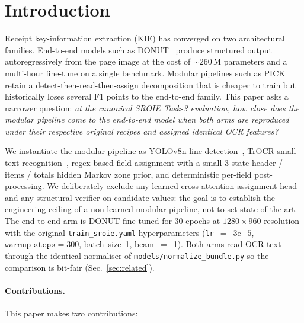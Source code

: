 
\section{Introduction}
\label{sec:intro}

Receipt key-information extraction (KIE) has converged on two
architectural families.  End-to-end models such as
DONUT~\cite{kim2022donut} produce structured output autoregressively
from the page image at the cost of $\sim\!260$\,M parameters and a
multi-hour fine-tune on a single benchmark.  Modular pipelines such as
PICK~\cite{yu2020pick} retain a detect-then-read-then-assign
decomposition that is cheaper to train but historically loses several
F1 points to the end-to-end family.  This paper asks a narrower
question: \emph{at the canonical SROIE Task-3 evaluation, how close
does the modular pipeline come to the end-to-end model when both arms
are reproduced under their respective original recipes and assigned
identical OCR features?}

We instantiate the modular pipeline as YOLOv8n line
detection~\cite{jocher2023yolov8}, TrOCR-small text
recognition~\cite{li2023trocr}, regex-based field assignment with a
small 3-state header / items / totals hidden Markov zone prior, and
deterministic per-field post-processing.  We deliberately exclude any
learned cross-attention assignment head and any structural verifier
on candidate values: the goal is to establish the engineering
ceiling of a non-learned modular pipeline, not to set state of the
art.  The end-to-end arm is DONUT fine-tuned for 30 epochs at
$1280\times 960$ resolution with the original
\texttt{train\_sroie.yaml} hyperparameters
(\texttt{lr}~$=$~3$\mathrm{e}{-5}$, $\texttt{warmup\_steps}=300$,
batch~size~1, beam~$=$~1).  Both arms read OCR text through the
identical normaliser of \texttt{models/normalize\_bundle.py} so the
comparison is bit-fair (Sec.~\ref{sec:related}).

\paragraph{Contributions.}  This paper makes two contributions:

